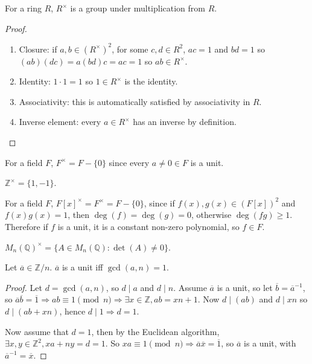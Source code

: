 \begin{definition}
	For a ring $R$, $R^{\times}$ is a group under multiplication from $R$.
\end{definition}

\begin{proof}
	\hfill
	\begin{enumerate}
		\item Closure: if $a, b \in {(R^{\times})}^2$, for some $c, d \in R^2$, $ac = 1$ and $bd = 1$ so $(ab)(dc) = a(bd)c = ac = 1$ so $ab \in R^{\times}$.
		\item Identity: $1 \cdot 1 = 1$ so $1 \in R^{\times}$ is the identity.
		\item Associativity: this is automatically satisfied by associativity in $R$.
		\item Inverse element: every $a \in R^{\times}$ has an inverse by definition.
	\end{enumerate}
\end{proof}

\begin{example}
	For a field $F$, $F^{\times} = F - \{ 0 \}$ since every $a \ne 0 \in F$ is a unit.
\end{example}

\begin{example}
	$\mathbb{Z}^{\times} = \{ 1, -1 \}$.
\end{example}

\begin{example}\label{exa:constantPolynomialUnitInField}
	For a field $F$, ${F[x]}^{\times} = F^{\times} = F - \{ 0 \}$, since if $f(x), g(x) \in {(F[x])}^2$ and $f(x) g(x) = 1$, then $\deg(f) = \deg(g) = 0$, otherwise $\deg(f g) \ge 1$. Therefore if $f$ is a unit, it is a constant non-zero polynomial, so $f \in F$.
\end{example}

\begin{example}
	${M_n(\mathbb{Q})}^{\times} = \{ A \in M_n(\mathbb{Q}): \det(A) \ne 0 \}$.
\end{example}

\begin{proposition}\label{prop:unitCoPrimeEquivalence}
	Let $\overline{a} \in \mathbb{Z} / n$. $\overline{a}$ is a unit iff $\gcd(a, n) = 1$.
\end{proposition}

\begin{proof}
	Let $d = \gcd(a, n)$, so $d \mid a$ and $d \mid n$. Assume $\overline{a}$ is a unit, so let $\overline{b} = \overline{a}^{-1}$, so $\overline{a} \overline{b} = \overline{1} \Rightarrow ab \equiv 1 \pmod{n} \Rightarrow \exists x \in \mathbb{Z}, ab = xn + 1$. Now $d \mid (ab)$ and $d \mid xn$ so $d \mid (ab + xn)$, hence $d \mid 1 \Rightarrow d = 1$.

	Now assume that $d = 1$, then by the Euclidean algorithm, $\exists x, y \in \mathbb{Z}^2, xa + ny = d = 1$. So $xa \equiv 1 \pmod{n} \Rightarrow \overline{a} \overline{x} = \overline{1}$, so $\overline{a}$ is a unit, with $\overline{a}^{-1} = \overline{x}$.
\end{proof}


